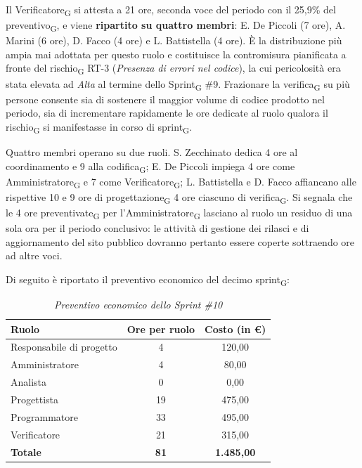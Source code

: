 ﻿\documentclass[a4paper, 10pt, colorlinks=true, linkcolor=black, urlcolor=blue, citecolor=blue, hidelinks]{article}
\renewcommand{\arraystretch}{1.2}
\begin{document}
Il Verificatore\textsubscript{G} si attesta a 21 ore, seconda voce del periodo con il 25,9\% del preventivo\textsubscript{G}, e viene \textbf{ripartito su quattro membri}: E. De Piccoli (7 ore), A. Marini (6 ore), D. Facco (4 ore) e L. Battistella (4 ore). È la distribuzione più ampia mai adottata per questo ruolo e costituisce la contromisura pianificata a fronte del rischio\textsubscript{G} RT-3 (\textit{Presenza di errori nel codice}), la cui pericolosità era stata elevata ad \textit{Alta} al termine dello Sprint\textsubscript{G} \#9. Frazionare la verifica\textsubscript{G} su più persone consente sia di sostenere il maggior volume di codice prodotto nel periodo, sia di incrementare rapidamente le ore dedicate al ruolo qualora il rischio\textsubscript{G} si manifestasse in corso di sprint\textsubscript{G}.

Quattro membri operano su due ruoli. S. Zecchinato dedica 4 ore al coordinamento e 9 alla codifica\textsubscript{G}; E. De Piccoli impiega 4 ore come Amministratore\textsubscript{G} e 7 come Verificatore\textsubscript{G}; L. Battistella e D. Facco affiancano alle rispettive 10 e 9 ore di progettazione\textsubscript{G} 4 ore ciascuno di verifica\textsubscript{G}. Si segnala che le 4 ore preventivate\textsubscript{G} per l'Amministratore\textsubscript{G} lasciano al ruolo un residuo di una sola ora per il periodo conclusivo: le attività di gestione dei rilasci e di aggiornamento del sito pubblico dovranno pertanto essere coperte sottraendo ore ad altre voci.

Di seguito è riportato il preventivo economico del decimo sprint\textsubscript{G}:

\begin{table}[H]
    \centering
    \renewcommand{\arraystretch}{1.4}
    \begin{tabular}{|l|c|c|}
        \hline
        \rowcolor{bluBitless!15}
        \textbf{Ruolo} & \textbf{Ore per ruolo} & \textbf{Costo (in €)} \\
        \hline
        Responsabile di progetto & 4 & 120,00 \\ \hline
        Amministratore & 4 & 80,00 \\ \hline
        Analista & 0 & 0,00 \\ \hline
        Progettista & 19 & 475,00 \\ \hline
        Programmatore & 33 & 495,00 \\ \hline
        Verificatore & 21 & 315,00 \\ \hline
        \rowcolor{bluBitless!8}
        \textbf{Totale} & \textbf{81} & \textbf{1.485,00} \\ \hline
    \end{tabular}
    \caption{\textit{Preventivo economico dello Sprint \#10}}
\end{table}
\end{document}
